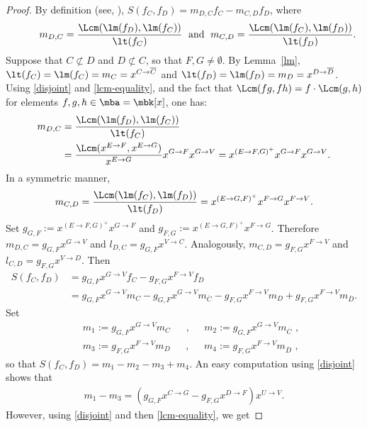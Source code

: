 \begin{proof}
By definition (see, \eg \cite[\S~2.6, Definition~4]{clo}),
$S(f_C,f_D)=m_{D,C}f_C-m_{C,D}f_D$, where
\begin{eqnarray}\label{mdc}
\phantom{+++} m_{D,C}=\frac{\Lcm(\lm(f_D),\lm(f_C))}{\lt(f_C)}\;
\mbox{ and }\; m_{C,D}=\frac{\Lcm(\lm(f_C),\lm(f_D))}{\lt(f_D)}.
\end{eqnarray}
Suppose that $C\not\subset D$ and $D\not\subset C$, so that
$F,G\neq\emptyset$. By Lemma~\ref{lm},
$\lt(f_C)=\lm(f_C)=m_C=x^{C\to\overline{C}}$ and
$\lt(f_D)=\lm(f_D)=m_D=x^{D\to\overline{D}}$. Using \eqref{disjoint}
and \eqref{lcm-equality}, and the fact that $\Lcm(fg,fh)=f\cdot
\Lcm(g,h)$ for elements $f,g,h\in \mba=\mbk[x]$, one has:
\begin{align}\label{lcmCD/C}
m_{D,C} & =\frac{\Lcm(\lm(f_D),\lm(f_C))}{\lt(f_C)}\\ &=
  \frac{\Lcm(x^{E\to F},x^{E\to G})}{x^{E\to G}}x^{G\to F}x^{G\to
    V}=x^{(E\to F,G)^{+}}x^{G\to F}x^{G\to V}. \notag
\end{align}
In a symmetric manner,
\begin{eqnarray}\label{lcmCD/D}
m_{C,D}=\frac{\Lcm(\lm(f_C),\lm(f_D))}{\lt(f_D)}=x^{(E\to
  G,F)^{+}}x^{F\to G}x^{F\to V}.
\end{eqnarray}
Set $g_{G,F}:=x^{(E\to F,G)^{+}}x^{G\to F}$ and $g_{F,G}:=x^{(E\to
  G,F)^{+}}x^{F\to G}$. Therefore $m_{D,C}=g_{G,F}x^{G\to V}$ and
$l_{D,C}=g_{G,F}x^{V\to C}$. Analogously, $m_{C,D}=g_{F,G}x^{F\to V}$
and $l_{C,D}=g_{F,G}x^{V\to D}$. Then
\begin{align*}
 S(f_C,f_D)&=g_{G,F}x^{G\to V}f_C-g_{F,G}x^{F\to V}f_{D}\\
&= g_{G,F}x^{G\to V}m_C-g_{G,F}x^{G\to V}m_{\overline{C}}-
g_{F,G}x^{F\to V}m_{D}+g_{F,G}x^{F\to V}m_{\overline{D}}.
\end{align*}
Set
\begin{eqnarray*}
&&m_1:=g_{G,F}x^{G\to V}m_C\phantom{+}\mbox{ ,
  }\phantom{+}m_2:=g_{G,F}x^{G\to V}m_{\overline{C}}\mbox{ , }
  \\&&m_3:=g_{F,G}x^{F\to V}m_{D}\phantom{+}\mbox{ ,
  }\phantom{+}m_4:=g_{F,G}x^{F\to V}m_{\overline{D}}\mbox{ , }
\end{eqnarray*}
so that $S(f_C,f_D)=m_1-m_2-m_3+m_4$. An easy computation using
\eqref{disjoint} shows that
\begin{eqnarray*}
m_1-m_3=(g_{G,F}x^{C\to G}-g_{F,G}x^{D\to F})x^{U\to V}.
\end{eqnarray*}
However, using \eqref{disjoint} and then \eqref{lcm-equality}, we get

\end{proof}
